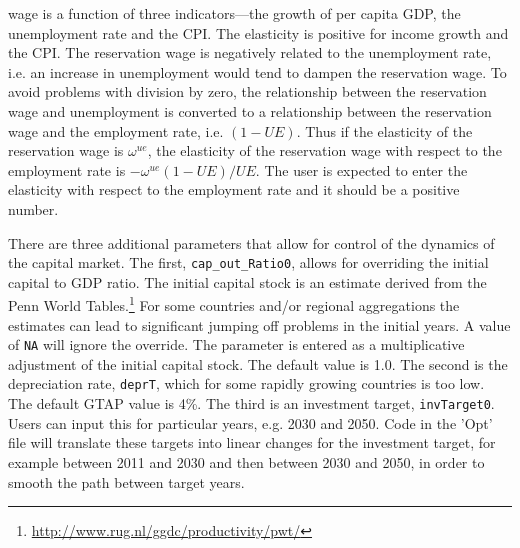 \begin{enumerate}
         wage is a function of three indicators---the growth of per capita GDP,
         the unemployment rate and the CPI. The elasticity is positive for
         income growth and the CPI. The reservation wage is negatively related
         to the unemployment rate, i.e. an increase in unemployment would tend
         to dampen the reservation wage. To avoid problems with division by
         zero, the relationship between the reservation wage and unemployment is
         converted to a relationship between the reservation wage and the
         employment rate, i.e. $(1-\mathit{UE})$. Thus if the elasticity of the
         reservation wage is $\omega^{\mathit{ue}}$, the elasticity of the
         reservation wage with respect to the employment rate is
         $-\omega^{\mathit{ue}}\left(1 - \mathit{UE}\right)/\mathit{UE}$. The
         user is expected to enter the elasticity with respect to the employment
         rate and it should be a positive number.
\end{enumerate}

There are three additional parameters that allow for control of the dynamics of
the capital market. The first, \texttt{cap\_out\_Ratio0}, allows for overriding
the initial capital to GDP ratio. The initial capital stock is an estimate
derived from the Penn World
Tables.\footnote{\url{http://www.rug.nl/ggdc/productivity/pwt/}} For some
countries and/or regional aggregations the estimates can lead to significant
jumping off problems in the initial years. A value of \texttt{NA} will ignore
the override. The parameter is entered as a multiplicative adjustment
of the initial capital stock. The default value is 1.0.
The second is the depreciation rate, \texttt{deprT}, which for
some rapidly growing countries is too low. The default GTAP value is 4\%. The
third is an investment target, \texttt{invTarget0}. Users can input this for
particular years, e.g. 2030 and 2050. Code in the 'Opt' file will translate
these targets into linear changes for the investment target, for example between
2011 and 2030 and then between 2030 and 2050, in order to smooth the path
between target years.

